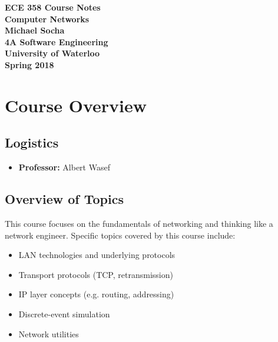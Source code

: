 \documentclass[12pt,titlepage]{article}
\begin{document}
  \begin{titlepage}
    \vspace*{\fill}
    \centering

    \textbf{\Huge ECE 358 Course Notes} \\ [0.4em]
    \textbf{\Large Computer Networks} \\ [1em]
    \textbf{\Large Michael Socha} \\ [1em]
    \textbf{\large 4A Software Engineering} \\
    \textbf{\large University of Waterloo} \\
    \textbf{\large Spring 2018} \\
    \vspace*{\fill}
  \end{titlepage}

  \newpage 


  \tableofcontents

  \newpage


  \section{Course Overview}
    \subsection{Logistics}
      \begin{itemize}
        \item \textbf{Professor:} Albert Wasef
      \end{itemize}

    \subsection{Overview of Topics}
      This course focuses on the fundamentals of networking and thinking like a network engineer.
      Specific topics covered by this course include:
      \begin{itemize}
        \item LAN technologies and underlying protocols
        \item Transport protocols (TCP, retransmission)
        \item IP layer concepts (e.g. routing, addressing)
        \item Discrete-event simulation
        \item Network utilities
      \end{itemize}
\end{document}
